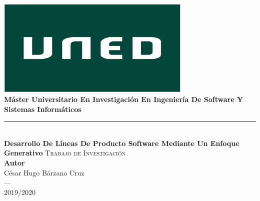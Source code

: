 \begin{titlepage}
 
 
\newlength{\centeroffset}
\setlength{\centeroffset}{-0.5\oddsidemargin}
\addtolength{\centeroffset}{0.5\evensidemargin}
\thispagestyle{empty}
\noindent\hspace*{\centeroffset}\begin{minipage}{\textwidth}
\centering
\includegraphics[width=0.7\textwidth]{imagenes/Logo-uned.jpg}\\[1.1cm]


{\Huge\bfseries Máster Universitario En Investigación En Ingeniería De Software Y Sistemas Informáticos\\
}
\noindent\rule[-1ex]{\textwidth}{3pt}\\[3.5ex]
{\large\bfseries Desarrollo De Líneas De Producto Software
Mediante Un Enfoque Generativo
}
\textsc{Trabajo de Investigación}\\
\textbf{Autor}\\ {César Hugo Bárzano Cruz}\\[2.5ex]
\textsc{---}\\
2019/2020
\end{minipage}
\end{titlepage}


